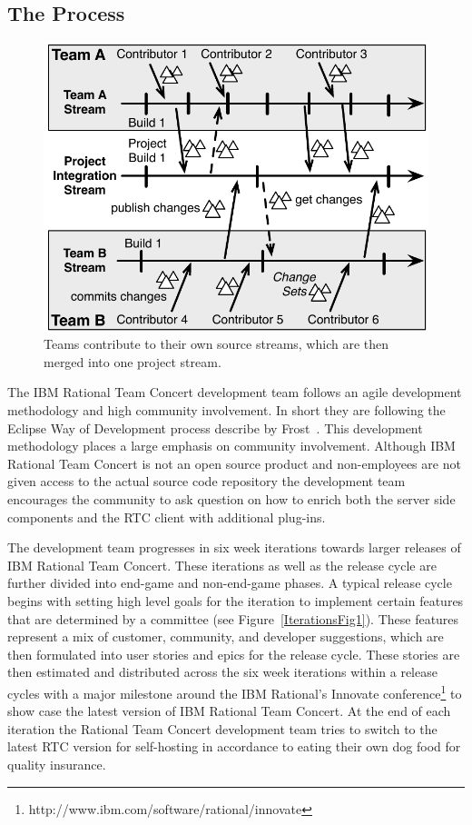 \subsection{The Process}
\begin{figure}[t]
\begin{center}
\includegraphics[width=.9\columnwidth]{figures/BuildResult}
\caption{Teams contribute to their own source streams, which are then merged into one project stream.}
\label{fig:buildresult1}
\end{center}
\end{figure}



The IBM Rational Team Concert development team follows an agile development methodology and high community involvement.
In short they are following the Eclipse Way of Development process describe by Frost~\cite{frost:ieeesoftware:2007}.
This development methodology places a large emphasis on community involvement.
Although IBM Rational Team Concert is not an open source product and non-employees are not given access to the actual source code repository the development team encourages the community to ask question on how to enrich both the server side components and the RTC client with additional plug-ins.

The development team progresses in six week iterations towards larger releases of IBM Rational Team Concert.
These iterations as well as the release cycle are further divided into end-game and non-end-game phases.
A typical release cycle begins with setting high level goals for the iteration to implement certain features that are determined by a committee (see Figure~\ref{IterationsFig1}).
These features represent a mix of customer, community, and developer suggestions, which are then formulated into user stories and epics for the release cycle.
These stories are then estimated and distributed across the six week iterations within a release cycles with a major milestone around the IBM Rational's Innovate conference\footnote{http://www.ibm.com/software/rational/innovate} to show case the latest version of IBM Rational Team Concert. 
At the end of each iteration the Rational Team Concert development team tries to switch to the latest RTC version for self-hosting in accordance to eating their own dog food for quality insurance.

